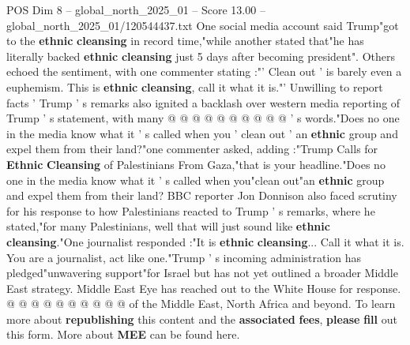 \begin{textsample}{POS Dim 8 – global\_north\_2025\_01 – Score 13.00 – global\_north\_2025\_01/120544437.txt}
One social media account said Trump"got to the \textbf{ethnic} \textbf{cleansing} in record time,"while another stated that"he has literally backed \textbf{ethnic} \textbf{cleansing} just 5 days after becoming president".
Others echoed the sentiment, with one commenter stating :"' Clean out ' is barely even a euphemism.
This is \textbf{ethnic} \textbf{cleansing}, call it what it is."' Unwilling to report facts ' Trump ' s remarks also ignited a backlash over western media reporting of Trump ' s statement, with many @ @ @ @ @ @ @ @ @ @ ' s words."Does no one in the media know what it ' s called when you ' clean out ' an \textbf{ethnic} group and expel them from their land?"one commenter asked, adding :"Trump Calls for \textbf{Ethnic} \textbf{Cleansing} of Palestinians From Gaza,"that is your headline."Does no one in the media know what it ' s called when you"clean out"an \textbf{ethnic} group and expel them from their land?
BBC reporter Jon Donnison also faced scrutiny for his response to how Palestinians reacted to Trump ' s remarks, where he stated,"for many Palestinians, well that will just sound like \textbf{ethnic} \textbf{cleansing}."One journalist responded :"It is \textbf{ethnic} \textbf{cleansing}...
Call it what it is.
You are a journalist, act like one."Trump ' s incoming administration has pledged"unwavering support"for Israel but has not yet outlined a broader Middle East strategy.
Middle East Eye has reached out to the White House for response. @ @ @ @ @ @ @ @ @ @ of the Middle East, North Africa and beyond.
To learn more about \textbf{republishing} this content and the \textbf{associated} \textbf{fees}, \textbf{please} \textbf{fill} out this form.
More about \textbf{MEE} can be found here.

\end{textsample}
